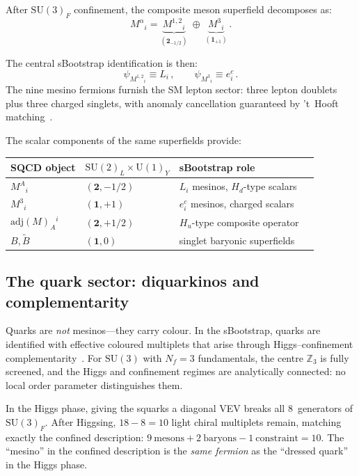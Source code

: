 \documentclass[12pt,a4paper]{article}
\newcommand{\SU}{\mathrm{SU}}
\newcommand{\UU}{\mathrm{U}}
\newcommand{\Nf}{N_{\!f}}
\newcommand{\adj}{\mathrm{adj}}
\begin{document}
After $\SU(3)_F$ confinement, the composite meson superfield
decomposes as:
\begin{equation}
  M^\alpha{}_i
  = \underbrace{M^{1,2}{}_i}_{(\mathbf{2}_{-1/2})}
  \;\oplus\;
  \underbrace{M^{3}{}_i}_{(\mathbf{1}_{+1})}\,.
  \label{eq:meson_decomp}
\end{equation}

The central sBootstrap identification is then:
\begin{equation}
  \boxed{
  \psi_{M^{1,2}{}_i} \equiv L_i\,,
  \qquad
  \psi_{M^{3}{}_i} \equiv e^c_i\,.
  }
  \label{eq:mesinos_leptons}
\end{equation}
The nine mesino fermions furnish the SM lepton sector:
three lepton doublets plus three charged singlets,
with anomaly cancellation guaranteed by 't~Hooft
matching~\cite{CsakiSchmaltzSkiba:1997}.

The scalar components of the same superfields provide:
\begin{center}
\begin{tabular}{llll}
\toprule
SQCD object & $\SU(2)_L \times \UU(1)_Y$ & sBootstrap role \\
\midrule
$M^{A}{}_i$ & $(\mathbf{2}, -1/2)$ & $L_i$ mesinos, $H_d$-type scalars \\
$M^{3}{}_i$ & $(\mathbf{1}, +1)$ & $e^c_i$ mesinos, charged scalars \\
$\adj(M)_A{}^{i}$ & $(\mathbf{2}, +1/2)$ & $H_u$-type composite operator \\
$B, \tilde{B}$ & $(\mathbf{1}, 0)$ & singlet baryonic superfields \\
\bottomrule
\end{tabular}
\end{center}

\subsection{The quark sector: diquarkinos and complementarity}

Quarks are \emph{not} mesinos---they carry colour.
In the sBootstrap, quarks are identified with effective coloured
multiplets that arise through Higgs--confinement
complementarity~\cite{FradkinShenker:1979}.
For $\SU(3)$ with $\Nf = 3$ fundamentals, the centre
$\mathbb{Z}_3$ is fully screened, and the Higgs and confinement
regimes are analytically connected: no local order parameter
distinguishes them.

In the Higgs phase, giving the squarks a diagonal VEV breaks
all 8~generators of $\SU(3)_F$.
After Higgsing, $18 - 8 = 10$ light chiral multiplets remain,
matching exactly the confined description:
$9~\text{mesons} + 2~\text{baryons} - 1~\text{constraint} = 10$.
The ``mesino'' in the confined description is the
\emph{same fermion} as the ``dressed quark'' in the Higgs phase.
\end{document}
